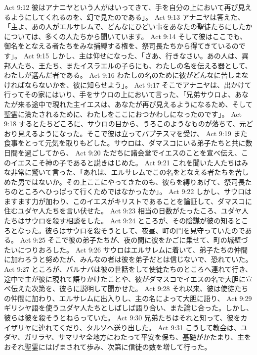 Act 9:12  彼はアナニヤという人がはいってきて、手を自分の上において再び見えるようにしてくれるのを、幻で見たのである」。
Act 9:13  アナニヤは答えた、「主よ、あの人がエルサレムで、どんなにひどい事をあなたの聖徒たちにしたかについては、多くの人たちから聞いています。
Act 9:14  そして彼はここでも、御名をとなえる者たちをみな捕縛する権を、祭司長たちから得てきているのです」。
Act 9:15  しかし、主は仰せになった、「さあ、行きなさい。あの人は、異邦人たち、王たち、またイスラエルの子らにも、わたしの名を伝える器として、わたしが選んだ者である。
Act 9:16  わたしの名のために彼がどんなに苦しまなければならないかを、彼に知らせよう」。
Act 9:17  そこでアナニヤは、出かけて行ってその家にはいり、手をサウロの上において言った、「兄弟サウロよ、あなたが来る途中で現れた主イエスは、あなたが再び見えるようになるため、そして聖霊に満たされるために、わたしをここにおつかわしになったのです」。
Act 9:18  するとたちどころに、サウロの目から、うろこのようなものが落ちて、元どおり見えるようになった。そこで彼は立ってバプテスマを受け、
Act 9:19  また食事をとって元気を取りもどした。サウロは、ダマスコにいる弟子たちと共に数日間を過ごしてから、
Act 9:20  ただちに諸会堂でイエスのことを宣べ伝え、このイエスこそ神の子であると説きはじめた。
Act 9:21  これを聞いた人たちはみな非常に驚いて言った、「あれは、エルサレムでこの名をとなえる者たちを苦しめた男ではないか。その上ここにやってきたのも、彼らを縛りあげて、祭司長たちのところへひっぱって行くためではなかったか」。
Act 9:22  しかし、サウロはますます力が加わり、このイエスがキリストであることを論証して、ダマスコに住むユダヤ人たちを言い伏せた。
Act 9:23  相当の日数がたったころ、ユダヤ人たちはサウロを殺す相談をした。
Act 9:24  ところが、その陰謀が彼の知るところとなった。彼らはサウロを殺そうとして、夜昼、町の門を見守っていたのである。
Act 9:25  そこで彼の弟子たちが、夜の間に彼をかごに乗せて、町の城壁づたいにつりおろした。
Act 9:26  サウロはエルサレムに着いて、弟子たちの仲間に加わろうと努めたが、みんなの者は彼を弟子だとは信じないで、恐れていた。
Act 9:27  ところが、バルナバは彼の世話をして使徒たちのところへ連れて行き、途中で主が彼に現れて語りかけたことや、彼がダマスコでイエスの名で大胆に宣べ伝えた次第を、彼らに説明して聞かせた。
Act 9:28  それ以来、彼は使徒たちの仲間に加わり、エルサレムに出入りし、主の名によって大胆に語り、
Act 9:29  ギリシヤ語を使うユダヤ人たちとしばしば語り合い、また論じ合った。しかし、彼らは彼を殺そうとねらっていた。
Act 9:30  兄弟たちはそれと知って、彼をカイザリヤに連れてくだり、タルソへ送り出した。
Act 9:31  こうして教会は、ユダヤ、ガリラヤ、サマリヤ全地方にわたって平安を保ち、基礎がかたまり、主をおそれ聖霊にはげまされて歩み、次第に信徒の数を増して行った。
